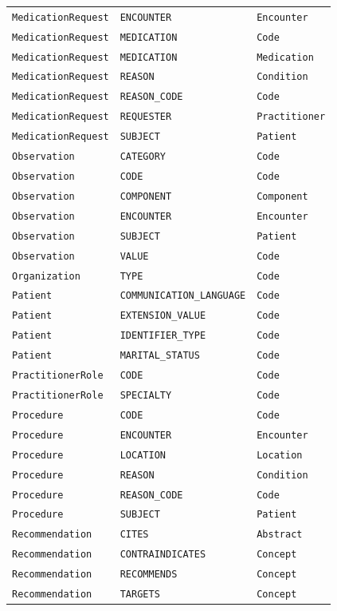 \begin{longtable}{@{}p{46mm}p{52mm}p{40mm}@{}}
\texttt{MedicationRequest} & \texttt{ENCOUNTER} & \texttt{Encounter} \\
\texttt{MedicationRequest} & \texttt{MEDICATION} & \texttt{Code} \\
\texttt{MedicationRequest} & \texttt{MEDICATION} & \texttt{Medication} \\
\texttt{MedicationRequest} & \texttt{REASON} & \texttt{Condition} \\
\texttt{MedicationRequest} & \texttt{REASON\_CODE} & \texttt{Code} \\
\texttt{MedicationRequest} & \texttt{REQUESTER} & \texttt{Practitioner} \\
\texttt{MedicationRequest} & \texttt{SUBJECT} & \texttt{Patient} \\
\texttt{Observation} & \texttt{CATEGORY} & \texttt{Code} \\
\texttt{Observation} & \texttt{CODE} & \texttt{Code} \\
\texttt{Observation} & \texttt{COMPONENT} & \texttt{Component} \\
\texttt{Observation} & \texttt{ENCOUNTER} & \texttt{Encounter} \\
\texttt{Observation} & \texttt{SUBJECT} & \texttt{Patient} \\
\texttt{Observation} & \texttt{VALUE} & \texttt{Code} \\
\texttt{Organization} & \texttt{TYPE} & \texttt{Code} \\
\texttt{Patient} & \texttt{COMMUNICATION\_LANGUAGE} & \texttt{Code} \\
\texttt{Patient} & \texttt{EXTENSION\_VALUE} & \texttt{Code} \\
\texttt{Patient} & \texttt{IDENTIFIER\_TYPE} & \texttt{Code} \\
\texttt{Patient} & \texttt{MARITAL\_STATUS} & \texttt{Code} \\
\texttt{PractitionerRole} & \texttt{CODE} & \texttt{Code} \\
\texttt{PractitionerRole} & \texttt{SPECIALTY} & \texttt{Code} \\
\texttt{Procedure} & \texttt{CODE} & \texttt{Code} \\
\texttt{Procedure} & \texttt{ENCOUNTER} & \texttt{Encounter} \\
\texttt{Procedure} & \texttt{LOCATION} & \texttt{Location} \\
\texttt{Procedure} & \texttt{REASON} & \texttt{Condition} \\
\texttt{Procedure} & \texttt{REASON\_CODE} & \texttt{Code} \\
\texttt{Procedure} & \texttt{SUBJECT} & \texttt{Patient} \\
\texttt{Recommendation} & \texttt{CITES} & \texttt{Abstract} \\
\texttt{Recommendation} & \texttt{CONTRAINDICATES} & \texttt{Concept} \\
\texttt{Recommendation} & \texttt{RECOMMENDS} & \texttt{Concept} \\
\texttt{Recommendation} & \texttt{TARGETS} & \texttt{Concept} \\
\end{longtable}

